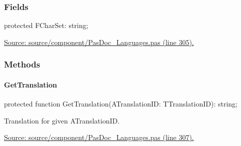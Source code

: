 \documentclass{report}
\newif\ifpdf
\begin{document}
\subsubsection*{\large{\textbf{Fields}}\normalsize\hspace{1ex}\hfill}
\begin{list}{}{
\setlength{\itemindent}{0cm}
\setlength{\listparindent}{0cm}
\setlength{\leftmargin}{\evensidemargin}
\addtolength{\leftmargin}{\tmplength}
\settowidth{\labelsep}{X}
\addtolength{\leftmargin}{\labelsep}
\setlength{\labelwidth}{\tmplength}
}
\label{PasDoc_Languages.TPasDocLanguages-FCharSet}
\item[\textbf{FCharSet}\hfill]
\ifpdf
\begin{flushleft}
\fi
\begin{ttfamily}
protected FCharSet: string;\end{ttfamily}

\ifpdf
\end{flushleft}
\fi


\par  \par
\href{https://github.com/pasdoc/pasdoc/blob/master/source/component/PasDoc_Languages.pas#L305}{Source: source/component/PasDoc{\_}Languages.pas (line 305).}\end{list}
\subsubsection*{\large{\textbf{Methods}}\normalsize\hspace{1ex}\hfill}
\paragraph*{GetTranslation}\hspace*{\fill}

\label{PasDoc_Languages.TPasDocLanguages-GetTranslation}
\begin{list}{}{
\setlength{\itemindent}{0cm}
\setlength{\listparindent}{0cm}
\setlength{\leftmargin}{\evensidemargin}
\addtolength{\leftmargin}{\tmplength}
\settowidth{\labelsep}{X}
\addtolength{\leftmargin}{\labelsep}
\setlength{\labelwidth}{\tmplength}
}
\item[\textbf{Declaration}\hfill]
\ifpdf
\begin{flushleft}
\fi
\begin{ttfamily}
protected function GetTranslation(ATranslationID: TTranslationID): string;\end{ttfamily}

\ifpdf
\end{flushleft}
\fi

\par
\item[\textbf{Description}]
Translation for given ATranslationID.\par
\href{https://github.com/pasdoc/pasdoc/blob/master/source/component/PasDoc_Languages.pas#L307}{Source: source/component/PasDoc{\_}Languages.pas (line 307).}

\end{list}
\end{document}
